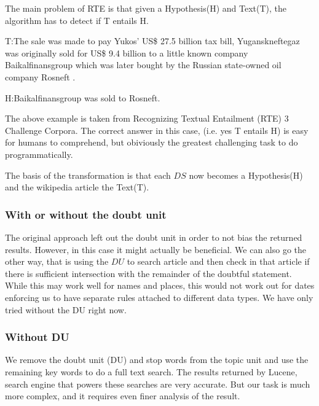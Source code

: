 \documentclass[12pt]{article}
\begin{document}
The main problem of RTE is that given a Hypothesis(H) and Text(T), the algorithm has to detect if T entails H.

T:The sale was made to pay Yukos' US\$ 27.5 billion tax bill, Yuganskneftegaz was originally sold for US\$ 9.4 billion to a little known company Baikalfinansgroup which was later bought by the Russian state-owned oil company Rosneft .

H:Baikalfinansgroup was sold to Rosneft.

The above example is taken from Recognizing Textual Entailment (RTE) 3 Challenge Corpora. The correct answer in this case, (i.e. yes T entails H) is easy for humans to comprehend, but obiviously the greatest challenging task to do programmatically.

The basis of the transformation is that each $DS$ now becomes a Hypothesis(H) and the wikipedia article the Text(T). 

\subsubsection{With or without the doubt unit}

The original approach left out the doubt unit in order to not bias the returned results. However, in this case it might actually be beneficial. We can also go the other way, that is using the $DU$ to search article and then check in that article if there is sufficient intersection with the remainder of the doubtful statement. While this may work well for names and places, this would not work out for dates enforcing us to have separate rules attached to different data types. We have only tried without the DU right now.

\subsubsection{Without DU}
We remove the doubt unit (DU) and stop words from the topic unit and use the remaining key words to do a full text search. The results returned by Lucene, search engine that powers these searches are very accurate. But our task is much more complex, and it requires even finer analysis of the result. 
\end{document}
